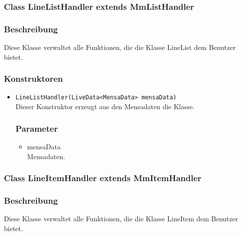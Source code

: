 \documentclass[a4paper]{scrreprt}
\begin{document}

\subsubsection{Class LineListHandler extends MmListHandler}
\subsubsection*{Beschreibung}
Diese Klasse verwaltet alle Funktionen, die die Klasse LineList dem Benutzer bietet.

\subsubsection*{Konstruktoren}
\begin{addmargin}[25pt]{0pt}
\begin{itemize}

\item \texttt{LineListHandler(LiveData<MensaData> mensaData)}\\
	Dieser Konstruktor erzeugt aus den Mensadaten die Klasse.

	\subsubsection*{Parameter}
	\begin{itemize}
	\item mensaData \\
		Mensadaten.
	\end{itemize}

\end{itemize}
\end{addmargin}


\subsubsection{Class LineItemHandler extends MmItemHandler}
\subsubsection*{Beschreibung}
Diese Klasse verwaltet alle Funktionen, die die Klasse LineItem dem Benutzer bietet.
\end{document}
